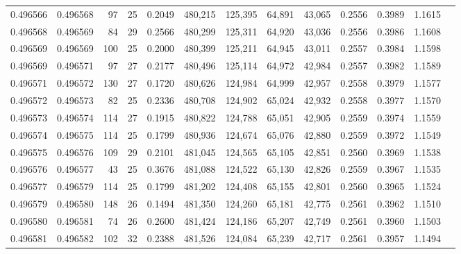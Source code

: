 \begin{tabular}{rrrrrrrrrrrrr}
0.496566 & 0.496568 &  97 &  25 &                                     0.2049 & 480,215 & 125,395 &  64,891 &  43,065 & 0.2556 & 0.3989 & 1.1615 \\
0.496568 & 0.496569 &  84 &  29 &                                     0.2566 & 480,299 & 125,311 &  64,920 &  43,036 & 0.2556 & 0.3986 & 1.1608 \\
0.496569 & 0.496569 & 100 &  25 &                                     0.2000 & 480,399 & 125,211 &  64,945 &  43,011 & 0.2557 & 0.3984 & 1.1598 \\
0.496569 & 0.496571 &  97 &  27 &                                     0.2177 & 480,496 & 125,114 &  64,972 &  42,984 & 0.2557 & 0.3982 & 1.1589 \\
0.496571 & 0.496572 & 130 &  27 &                                     0.1720 & 480,626 & 124,984 &  64,999 &  42,957 & 0.2558 & 0.3979 & 1.1577 \\
0.496572 & 0.496573 &  82 &  25 &                                     0.2336 & 480,708 & 124,902 &  65,024 &  42,932 & 0.2558 & 0.3977 & 1.1570 \\
0.496573 & 0.496574 & 114 &  27 &                                     0.1915 & 480,822 & 124,788 &  65,051 &  42,905 & 0.2559 & 0.3974 & 1.1559 \\
0.496574 & 0.496575 & 114 &  25 &                                     0.1799 & 480,936 & 124,674 &  65,076 &  42,880 & 0.2559 & 0.3972 & 1.1549 \\
0.496575 & 0.496576 & 109 &  29 &                                     0.2101 & 481,045 & 124,565 &  65,105 &  42,851 & 0.2560 & 0.3969 & 1.1538 \\
0.496576 & 0.496577 &  43 &  25 &                                     0.3676 & 481,088 & 124,522 &  65,130 &  42,826 & 0.2559 & 0.3967 & 1.1535 \\
0.496577 & 0.496579 & 114 &  25 &                                     0.1799 & 481,202 & 124,408 &  65,155 &  42,801 & 0.2560 & 0.3965 & 1.1524 \\
0.496579 & 0.496580 & 148 &  26 &                                     0.1494 & 481,350 & 124,260 &  65,181 &  42,775 & 0.2561 & 0.3962 & 1.1510 \\
0.496580 & 0.496581 &  74 &  26 &                                     0.2600 & 481,424 & 124,186 &  65,207 &  42,749 & 0.2561 & 0.3960 & 1.1503 \\
0.496581 & 0.496582 & 102 &  32 &                                     0.2388 & 481,526 & 124,084 &  65,239 &  42,717 & 0.2561 & 0.3957 & 1.1494 \\

\end{tabular}
